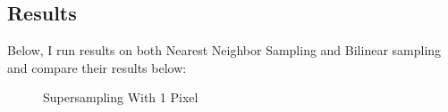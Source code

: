 \documentclass{article}
\begin{document}
\subsection{Results}
Below, I run results on both Nearest Neighbor Sampling and Bilinear sampling and compare their results below:
\begin{figure}[H]
    \centering
    \caption{Supersampling With 1 Pixel}
    \label{ref_label_overall}
\end{figure}
\end{document}
